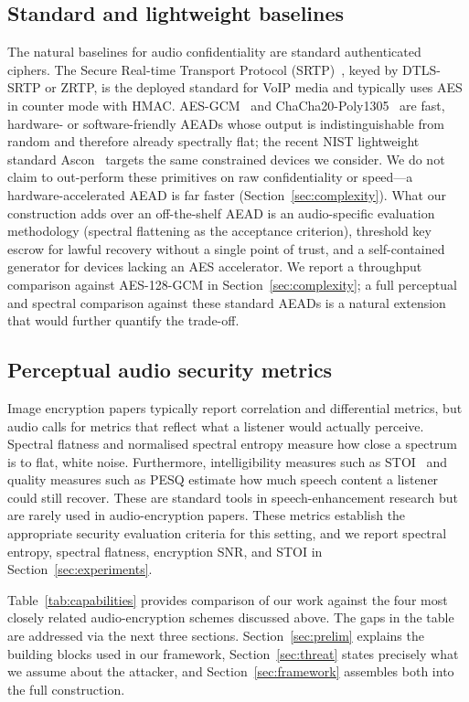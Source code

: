 \documentclass[pdflatex,sn-mathphys-num]{sn-jnl}%
\theoremstyle{thmstyleone}%
\theoremstyle{thmstyletwo}%
\theoremstyle{thmstylethree}%
\begin{document}
\subsection{Standard and lightweight baselines}
The natural baselines for audio confidentiality are standard authenticated ciphers. The Secure Real-time Transport Protocol (SRTP)~\cite{rfc3711}, keyed by DTLS-SRTP or ZRTP, is the deployed standard for VoIP media and typically uses AES in counter mode with HMAC. AES-GCM~\cite{dworkin2007} and ChaCha20-Poly1305~\cite{rfc8439} are fast, hardware- or software-friendly AEADs whose output is indistinguishable from random and therefore already spectrally flat; the recent NIST lightweight standard Ascon~\cite{nistsp800232} targets the same constrained devices we consider. We do not claim to out-perform these primitives on raw confidentiality or speed---a hardware-accelerated AEAD is far faster (Section~\ref{sec:complexity}). What our construction adds over an off-the-shelf AEAD is an audio-specific evaluation methodology (spectral flattening as the acceptance criterion), threshold key escrow for lawful recovery without a single point of trust, and a self-contained generator for devices lacking an AES accelerator. We report a throughput comparison against AES-128-GCM in Section~\ref{sec:complexity}; a full perceptual and spectral comparison against these standard AEADs is a natural extension that would further quantify the trade-off.

\subsection{Perceptual audio security metrics}
Image encryption papers typically report correlation and differential
metrics, but audio calls for metrics that reflect what a listener would
actually perceive. Spectral flatness and normalised spectral entropy measure
how close a spectrum is to flat, white noise. Furthermore, intelligibility measures such as
STOI~\cite{taal2011} and quality measures such as PESQ estimate how much
speech content a listener could still recover. These are standard tools in
speech-enhancement research but are rarely used in audio-encryption papers. These metrics establish the appropriate security evaluation criteria for this setting, and we report spectral entropy, spectral flatness, encryption SNR, and STOI in
Section~\ref{sec:experiments}.

Table~\ref{tab:capabilities} provides comparison of our work against the four
most closely related audio-encryption schemes discussed above. The gaps in
the table are addressed via the next three sections. Section~\ref{sec:prelim} explains the building blocks used in our framework, Section~\ref{sec:threat} states precisely what we assume about the attacker, and
Section~\ref{sec:framework} assembles both into the full construction.
\end{document}
